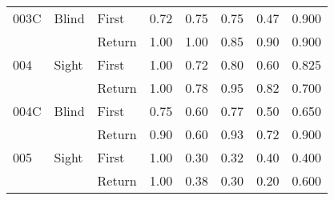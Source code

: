 \begin{table}[!htb]
\begin{tabular}{lllrrrrr}
003C & Blind & First &  0.72 &  0.75 &                                                  0.75 &                                                   0.47 &   0.900 \\
    &       & Return &  1.00 &  1.00 &                                                  0.85 &                                                   0.90 &   0.900 \\
004 & Sight & First &  1.00 &  0.72 &                                                  0.80 &                                                   0.60 &   0.825 \\
    &       & Return &  1.00 &  0.78 &                                                  0.95 &                                                   0.82 &   0.700 \\
004C & Blind & First &  0.75 &  0.60 &                                                  0.77 &                                                   0.50 &   0.650 \\
    &       & Return &  0.90 &  0.60 &                                                  0.93 &                                                   0.72 &   0.900 \\
005 & Sight & First &  1.00 &  0.30 &                                                  0.32 &                                                   0.40 &   0.400 \\
    &       & Return &  1.00 &  0.38 &                                                  0.30 &                                                   0.20 &   0.600 \\
\bottomrule
\end{tabular}
\end{table}

